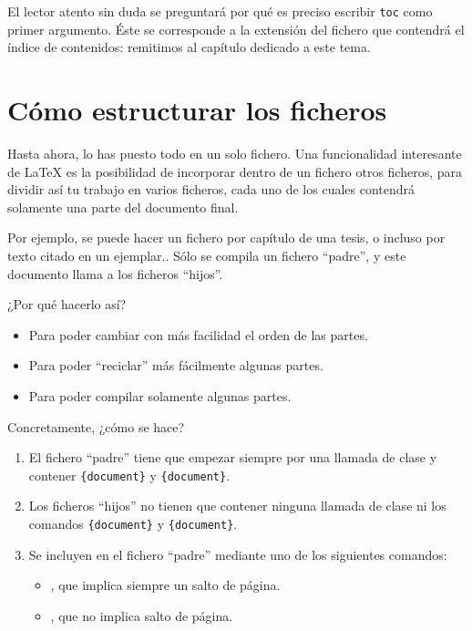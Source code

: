 \begin{plusloins}
El lector atento sin duda se preguntará por qué es preciso escribir \verb|toc| como primer argumento. Éste se corresponde a la extensión del fichero que contendrá el índice de contenidos: remitimos al capítulo dedicado a este tema.
\end{plusloins}

\section{Cómo estructurar los ficheros}\label{inclusion}

Hasta ahora, lo has puesto todo en un solo fichero. Una funcionalidad interesante de \LaTeX{} es la posibilidad de incorporar dentro de un fichero otros ficheros, para dividir así tu trabajo en varios ficheros, cada uno de los cuales contendrá solamente una parte del documento final.

Por ejemplo, se puede hacer un fichero por capítulo de una tesis, o incluso por texto citado en un ejemplar.. Sólo se compila un fichero \enquote{padre}, y este documento llama a los ficheros \enquote{hijos}.

¿Por qué hacerlo así?
\begin{itemize}
\item Para poder cambiar con más facilidad el orden de las partes. 
\item Para poder \enquote{reciclar} más fácilmente algunas partes.
\item Para poder compilar solamente algunas partes.
\end{itemize}

Concretamente, ¿cómo se hace?
\begin{enumerate}
\item El fichero \enquote{padre} tiene que empezar siempre por una llamada de clase y contener \verb|{document}| y \verb|{document}|.
\item Los ficheros \enquote{hijos} no tienen que contener ninguna llamada de clase ni los comandos \verb|{document}| y \verb|{document}|.
\item Se incluyen en el fichero \enquote{padre} mediante uno de los siguientes comandos:
\begin{itemize}
    \item {}, que implica siempre un salto de página.
    \item {}, que no implica salto de página.\label{input}
\end{itemize}
\end{enumerate}

